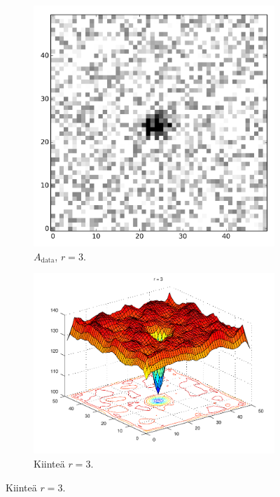 \begin{figure}[p]
    \centering
    \hspace{-1em}
    \begin{subfigure}[b]{0.3\textwidth}
        \includegraphics[width=\textwidth]{figures/golfholedata.png}
        \caption{$A_\text{data}$, $r=3$.
            \label{fig:golfhole_data}
        }
    \end{subfigure}

    \begin{subfigure}[b]{0.7\textwidth}
            \includegraphics[width=\textwidth]{figures/golfhole2.pdf}
        \caption{Kiinteä $r=3$. 
            \label{fig:golfhole2}
        }
    \end{subfigure}


\end{figure}
